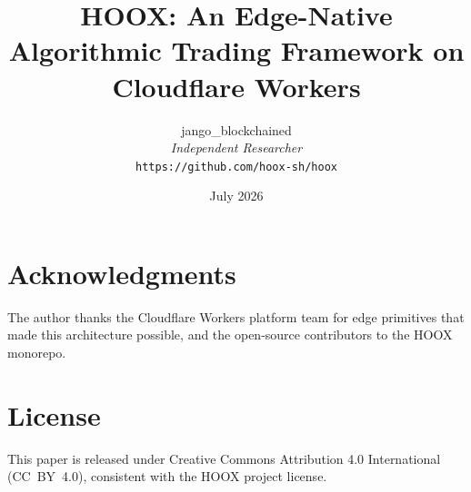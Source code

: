 \documentclass[10pt,a4paper]{article}
\title{\textbf{HOOX: An Edge-Native Algorithmic Trading Framework on Cloudflare Workers}}
\author{
  jango\_blockchained \\
  \small\textit{Independent Researcher} \\
  \small\texttt{https://github.com/hoox-sh/hoox}
}
\date{July 2026}
\begin{document}
\maketitle














\section*{Acknowledgments}

The author thanks the Cloudflare Workers platform team for edge primitives that made this architecture possible, and the open-source contributors to the \textsc{HOOX} monorepo.

\section*{License}

This paper is released under Creative Commons Attribution 4.0 International (CC~BY~4.0), consistent with the \textsc{HOOX} project license.




\appendix




\end{document}
